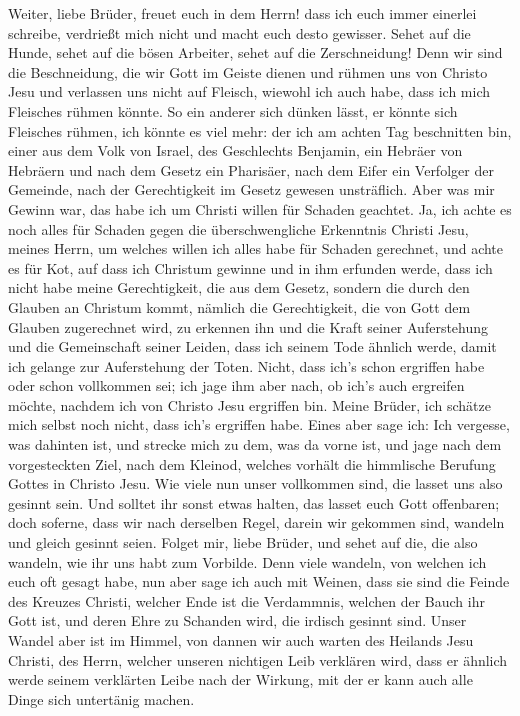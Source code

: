  Weiter, liebe Brüder, freuet euch in dem Herrn! dass ich
euch immer einerlei schreibe, verdrießt mich nicht und macht euch desto
gewisser.  Sehet auf die Hunde, sehet auf die bösen
Arbeiter, sehet auf die Zerschneidung!  Denn wir sind die
Beschneidung, die wir Gott im Geiste dienen und rühmen uns von Christo
Jesu und verlassen uns nicht auf Fleisch,  wiewohl ich
auch habe, dass ich mich Fleisches rühmen könnte. So ein anderer sich
dünken lässt, er könnte sich Fleisches rühmen, ich könnte es viel mehr:
 der ich am achten Tag beschnitten bin, einer aus dem Volk
von Israel, des Geschlechts Benjamin, ein Hebräer von Hebräern und nach
dem Gesetz ein Pharisäer,  nach dem Eifer ein Verfolger
der Gemeinde, nach der Gerechtigkeit im Gesetz gewesen unsträflich.
 Aber was mir Gewinn war, das habe ich um Christi willen
für Schaden geachtet.  Ja, ich achte es noch alles für
Schaden gegen die überschwengliche Erkenntnis Christi Jesu, meines
Herrn, um welches willen ich alles habe für Schaden gerechnet, und achte
es für Kot, auf dass ich Christum gewinne  und in ihm
erfunden werde, dass ich nicht habe meine Gerechtigkeit, die aus dem
Gesetz, sondern die durch den Glauben an Christum kommt, nämlich die
Gerechtigkeit, die von Gott dem Glauben zugerechnet wird,
 zu erkennen ihn und die Kraft seiner Auferstehung und
die Gemeinschaft seiner Leiden, dass ich seinem Tode ähnlich werde,
 damit ich gelange zur Auferstehung der Toten.
 Nicht, dass ich's schon ergriffen habe oder schon
vollkommen sei; ich jage ihm aber nach, ob ich's auch ergreifen möchte,
nachdem ich von Christo Jesu ergriffen bin.  Meine
Brüder, ich schätze mich selbst noch nicht, dass ich's ergriffen habe.
Eines aber sage ich: Ich vergesse, was dahinten ist, und strecke mich zu
dem, was da vorne ist,  und jage nach dem vorgesteckten
Ziel, nach dem Kleinod, welches vorhält die himmlische Berufung Gottes
in Christo Jesu.  Wie viele nun unser vollkommen sind,
die lasset uns also gesinnt sein. Und solltet ihr sonst etwas halten,
das lasset euch Gott offenbaren;  doch soferne, dass wir
nach derselben Regel, darein wir gekommen sind, wandeln und gleich
gesinnt seien.  Folget mir, liebe Brüder, und sehet auf
die, die also wandeln, wie ihr uns habt zum Vorbilde. 
Denn viele wandeln, von welchen ich euch oft gesagt habe, nun aber sage
ich auch mit Weinen, dass sie sind die Feinde des Kreuzes Christi,
 welcher Ende ist die Verdammnis, welchen der Bauch ihr
Gott ist, und deren Ehre zu Schanden wird, die irdisch gesinnt sind.
 Unser Wandel aber ist im Himmel, von dannen wir auch
warten des Heilands Jesu Christi, des Herrn,  welcher
unseren nichtigen Leib verklären wird, dass er ähnlich werde seinem
verklärten Leibe nach der Wirkung, mit der er kann auch alle Dinge sich
untertänig machen.

